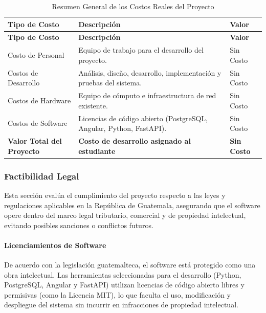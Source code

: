 {
\small
{}
\setlength{\parindent}{0pt}
\begin{xltabular}{\linewidth}{
    >{\raggedright\arraybackslash}p{3.5cm} 
    >{\raggedright\arraybackslash}X 
    >{\raggedright\arraybackslash}p{2.5cm}
}

    \caption{Resumen General de los Costos Reales del Proyecto} \label{tab:costos_reales} \\
    \toprule
    \textbf{Tipo de Costo} & \textbf{Descripción} & \textbf{Valor} \\
    \midrule
    \endfirsthead

    \toprule
    \textbf{Tipo de Costo} & \textbf{Descripción} & \textbf{Valor} \\
    \midrule
    \endhead

    \endfoot

    \bottomrule
\endlastfoot

    Costo de Personal & Equipo de trabajo para el desarrollo del proyecto. & Sin Costo \\
    \addlinespace
    Costos de Desarrollo & Análisis, diseño, desarrollo, implementación y pruebas del sistema. & Sin Costo \\
    \addlinespace
    Costos de Hardware & Equipo de cómputo e infraestructura de red existente. & Sin Costo \\
    \addlinespace
    Costos de Software & Licencias de código abierto (PostgreSQL, Angular, Python, FastAPI). & Sin Costo \\
    \addlinespace
    \textbf{Valor Total del Proyecto} & \textbf{Costo de desarrollo asignado al estudiante} & \textbf{Sin Costo} \\
\end{xltabular}
}

\subsubsection{Factibilidad Legal}

Esta sección evalúa el cumplimiento del proyecto respecto a las leyes y regulaciones aplicables en la República de Guatemala, asegurando que el software opere dentro del marco legal tributario, comercial y de propiedad intelectual, evitando posibles sanciones o conflictos futuros.

\paragraph{Licenciamientos de Software}
De acuerdo con la legislación guatemalteca, el software está protegido como una obra intelectual. Las herramientas seleccionadas para el desarrollo (Python, PostgreSQL, Angular y FastAPI) utilizan licencias de código abierto libres y permisivas (como la Licencia MIT), lo que faculta el uso, modificación y despliegue del sistema sin incurrir en infracciones de propiedad intelectual.

